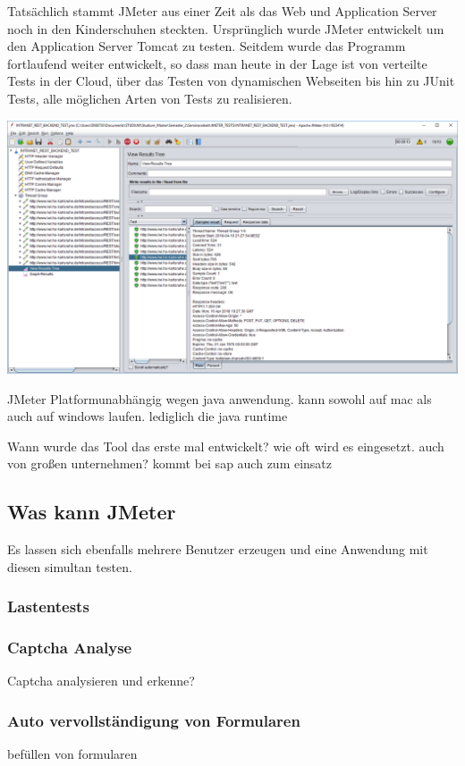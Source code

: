 \documentclass[a4paper,12pt]{article}
\begin{document}
Tatsächlich stammt JMeter aus einer Zeit als das Web und Application Server noch in den Kinderschuhen steckten. Ursprünglich wurde JMeter entwickelt um den Application Server Tomcat zu testen. Seitdem wurde das Programm fortlaufend weiter entwickelt, so dass man heute in der Lage ist von verteilte Tests in der Cloud, über das Testen von dynamischen Webseiten bis hin zu JUnit Tests, alle möglichen Arten von Tests zu realisieren. \cite{online:ApacheJMeter}

 
\includegraphics[width=1\textwidth]{bilder/jmeter_1.png}\par\vspace{1cm}
JMeter Platformunabhängig wegen java anwendung. kann sowohl auf mac als auch auf windows laufen. lediglich die java runtime

Wann wurde das Tool das erste mal entwickelt? wie oft wird es eingesetzt. auch von großen unternehmen? kommt bei sap auch zum einsatz

\subsection{Was kann JMeter}
Es lassen sich ebenfalls mehrere Benutzer erzeugen und eine Anwendung mit diesen simultan testen.  
 
\subsubsection{Lastentests}

\subsubsection{Captcha Analyse}
Captcha analysieren und erkenne?

\subsubsection{Auto vervollständigung von Formularen}
befüllen von formularen
\end{document}
